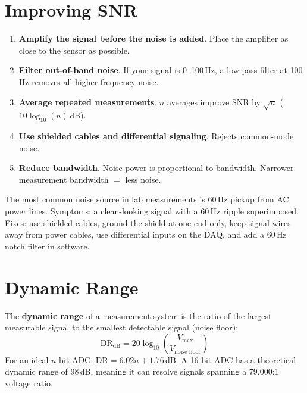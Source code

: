 \documentclass[11pt,letterpaper,twoside,openany]{book}
\begin{document}
\section{Improving SNR}
\begin{enumerate}[leftmargin=1.5em]
\item \textbf{Amplify the signal before the noise is added}. Place the amplifier as close to the sensor as possible.
\item \textbf{Filter out-of-band noise}. If your signal is 0--100\,Hz, a low-pass filter at 100\,Hz removes all higher-frequency noise.
\item \textbf{Average repeated measurements}. $n$ averages improve SNR by $\sqrt{n}$ ($10\log_{10}(n)$\,dB).
\item \textbf{Use shielded cables and differential signaling}. Rejects common-mode noise.
\item \textbf{Reduce bandwidth}. Noise power is proportional to bandwidth. Narrower measurement bandwidth $=$ less noise.
\end{enumerate}

\begin{warningbox}[60\,Hz Hum]
The most common noise source in lab measurements is 60\,Hz pickup from AC power lines. Symptoms: a clean-looking signal with a 60\,Hz ripple superimposed. Fixes: use shielded cables, ground the shield at one end only, keep signal wires away from power cables, use differential inputs on the DAQ, and add a 60\,Hz notch filter in software.
\end{warningbox}


\section{Dynamic Range}
The \textbf{dynamic range} of a measurement system is the ratio of the largest measurable signal to the smallest detectable signal (noise floor):
\begin{equation}
\text{DR}_{\text{dB}} = 20 \log_{10}\left(\frac{V_{\text{max}}}{V_{\text{noise floor}}}\right)
\end{equation}
For an ideal $n$-bit ADC: $\text{DR} = 6.02n + 1.76$\,dB. A 16-bit ADC has a theoretical dynamic range of 98\,dB, meaning it can resolve signals spanning a 79,000:1 voltage ratio.
\end{document}
